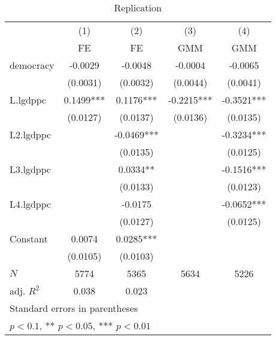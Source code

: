 \begin{table}[htbp]\centering
\def\sym#1{\ifmmode^{#1}\else\(^{#1}\)\fi}
\caption{Replication \label{tab:regression1}}
\begin{tabular}{l*{4}{c}}
\hline\hline
            &\multicolumn{1}{c}{(1)}&\multicolumn{1}{c}{(2)}&\multicolumn{1}{c}{(3)}&\multicolumn{1}{c}{(4)}\\
            &\multicolumn{1}{c}{FE}&\multicolumn{1}{c}{FE}&\multicolumn{1}{c}{GMM}&\multicolumn{1}{c}{GMM}\\
\hline
democracy   &     -0.0029   &     -0.0048   &     -0.0004   &     -0.0065   \\
            &    (0.0031)   &    (0.0032)   &    (0.0044)   &    (0.0041)   \\
[1em]
L.lgdppc    &      0.1499***&      0.1176***&     -0.2215***&     -0.3521***\\
            &    (0.0127)   &    (0.0137)   &    (0.0136)   &    (0.0135)   \\
[1em]
L2.lgdppc   &               &     -0.0469***&               &     -0.3234***\\
            &               &    (0.0135)   &               &    (0.0125)   \\
[1em]
L3.lgdppc   &               &      0.0334** &               &     -0.1516***\\
            &               &    (0.0133)   &               &    (0.0123)   \\
[1em]
L4.lgdppc   &               &     -0.0175   &               &     -0.0652***\\
            &               &    (0.0127)   &               &    (0.0125)   \\
[1em]
Constant    &      0.0074   &      0.0285***&               &               \\
            &    (0.0105)   &    (0.0103)   &               &               \\
\hline
\(N\)       &        5774   &        5365   &        5634   &        5226   \\
adj. \(R^{2}\)&       0.038   &       0.023   &               &               \\
\hline\hline
\multicolumn{5}{l}{\footnotesize Standard errors in parentheses}\\
\multicolumn{5}{l}{\footnotesize * \(p<0.1\), ** \(p<0.05\), *** \(p<0.01\)}\\
\end{tabular}
\end{table}
